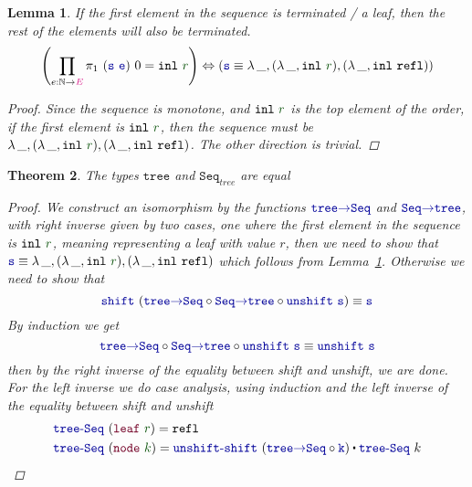 \documentclass[twoside,11pt,openright]{report}
\theoremstyle{plain} %
\newtheorem{thm}{Theorem}[section]
\newtheorem{lem}[thm]{Lemma}
\theoremstyle{definition}
\theoremstyle{remark}
\newcommand*{\lemref}[1]{Lemma~\ref{lem:#1}}
\newcommand*{\term}[1]{\textcolor{green!30!black}{#1}} %
\newcommand*{\type}[1]{\textcolor{magenta!90!black}{#1}}
\newcommand*{\function}[1]{\textcolor{blue!60!black}{\ensuremath{\mathtt{#1}}}}
\newcommand*{\constructor}[1]{\textcolor{purple!60!black}{\ensuremath{\mathtt{#1}}}}
\newcommand*{\typeformer}[1]{\ensuremath{\mathtt{#1}}}
\newcommand{\ct}{%
  \mathchoice{\mathbin{\raisebox{0.5ex}{$\displaystyle\centerdot$}}}%
             {\mathbin{\raisebox{0.5ex}{$\centerdot$}}}%
             {\mathbin{\raisebox{0.25ex}{$\scriptstyle\,\centerdot\,$}}}%
             {\mathbin{\raisebox{0.1ex}{$\scriptscriptstyle\,\centerdot\,$}}}
}
\begin{document}
\begin{lem}
  \label{lem:seq-first-is-leaf}
  If the first element in the sequence is terminated / a leaf, then the rest of the elements will also be terminated.
  \begin{equation}
    \left(\prod_{e : \mathbb{N} \rightarrow \type{E}} \pi_1~(\function{s}~\function{e})~0 = \mathtt{inl}~\term{r}\right) \Leftrightarrow \left(\function{s} \equiv \lambda\,\_,(\lambda\,\_,\mathtt{inl}~\term{r}),(\lambda\,\_,\mathtt{inl}~\mathtt{refl})\right)
  \end{equation}
  \begin{proof}
    Since the sequence is monotone, and \(\mathtt{inl}~\term{r}\) is the top element of the order, if the first element is \(\mathtt{inl}~\term{r}\), then the sequence must be \(\lambda\,\_,(\lambda\,\_,\mathtt{inl}~\term{r}),(\lambda\,\_,\mathtt{inl}~\mathtt{refl})\). The other direction is trivial.
  \end{proof}
\end{lem}
\begin{thm}
  The types \(\typeformer{tree}\) and \(\typeformer{Seq}_{tree}\) are equal
  \begin{proof}
    We construct an isomorphism by the functions \(\function{tree{\rightarrow}Seq}\) and \(\function{Seq{\rightarrow}tree}\), with right inverse given by two cases, one where the first element in the sequence is \(\mathtt{inl}~\term{r}\), meaning representing a leaf with value \(r\), then we need to show that \(\function{s} \equiv \lambda\,\_,(\lambda\,\_,\mathtt{inl}~\term{r}),(\lambda\,\_,\mathtt{inl}~\mathtt{refl})\) which follows from \lemref{seq-first-is-leaf}. Otherwise we need to show that
    \begin{equation}
      \function{shift}~(\function{tree{\rightarrow}Seq} \circ \function{Seq{\rightarrow}tree} \circ \function{unshift}~\function{s}) \equiv \function{s}
    \end{equation}
    By induction we get
    \begin{equation}
      \function{tree{\rightarrow}Seq} \circ \function{Seq{\rightarrow}tree} \circ \function{unshift}~\function{s} \equiv \function{unshift}~\function{s}
    \end{equation}
    then by the right inverse of the equality between shift and unshift, we are done. For the left inverse we do case analysis, using induction and the left inverse of the equality between shift and unshift
    \begin{equation}
      \begin{aligned}
        &\function{tree\text{-}Seq}~(\constructor{leaf}~\term{r}) = \mathtt{refl} \\
        &\function{tree\text{-}Seq}~(\constructor{node}~\term{k}) = \function{unshift\text{-}shift}~(\function{tree{\rightarrow}Seq} \circ \function{k}) \ct \function{tree\text{-}Seq}~k
      \end{aligned}
    \end{equation}
  \end{proof}
\end{thm}
\end{document}
